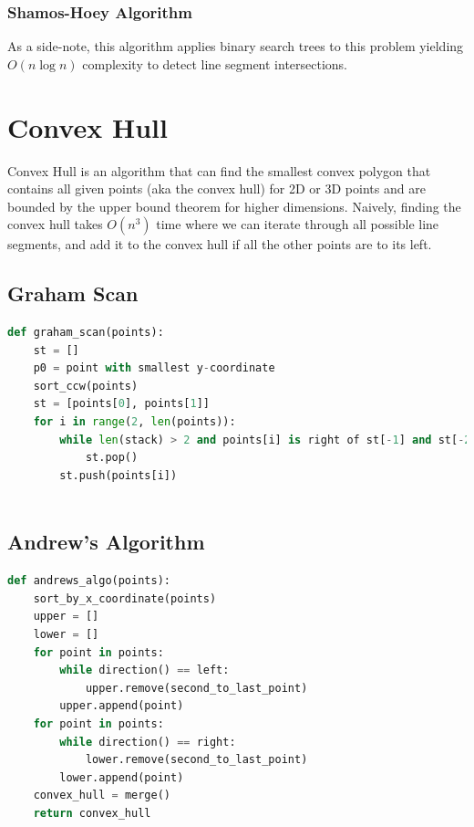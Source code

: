\documentclass{article}
\begin{document}
\subsubsection{Shamos-Hoey Algorithm}
As a side-note, this algorithm applies binary search trees to this problem yielding $O(n\log n)$ complexity to detect line segment intersections.

\section{Convex Hull}
Convex Hull is an algorithm that can find the smallest convex polygon that contains all given points (aka the convex hull) for 2D or 3D points and are bounded by the upper bound theorem for higher dimensions. Naively, finding the convex hull takes $O(n^3)$ time where we can iterate through all possible line segments, and add it to the convex hull if all the other points are to its left.
\subsection{Graham Scan}
\begin{lstlisting}[language=python]
def graham_scan(points):
    st = []
    p0 = point with smallest y-coordinate
    sort_ccw(points)
    st = [points[0], points[1]]
    for i in range(2, len(points)):
        while len(stack) > 2 and points[i] is right of st[-1] and st[-2]:
            st.pop()
        st.push(points[i])
        
\end{lstlisting}

\subsection{Andrew's Algorithm}
\begin{lstlisting}[language=python]
def andrews_algo(points):
    sort_by_x_coordinate(points)
    upper = []
    lower = []
    for point in points:
        while direction() == left:
            upper.remove(second_to_last_point)
        upper.append(point)
    for point in points:
        while direction() == right:
            lower.remove(second_to_last_point)
        lower.append(point)
    convex_hull = merge()
    return convex_hull
\end{lstlisting}
\end{document}
